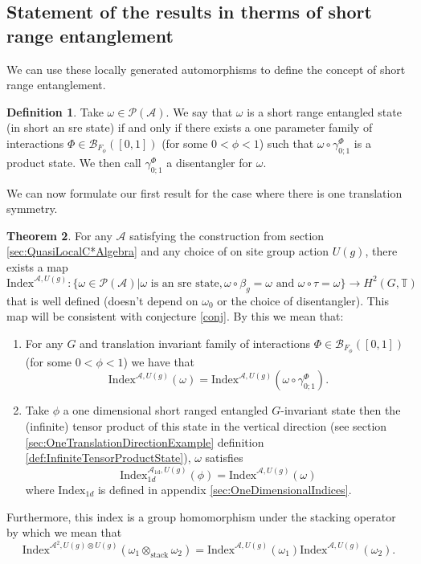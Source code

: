 \documentclass[12pt,a4paper,twoside]{article}
\newcommand{\BB}{\mathcal B}
\newcommand{\PP}{\mathcal P}
\newcommand{\TT}{\mathbb T}
\renewcommand{\AA}{\mathcal A}
\theoremstyle{definition}
\newtheorem{theorem}{Theorem}[section]
\newtheorem{definition}[theorem]{Definition}
\numberwithin{equation}{section}
\begin{document}
\subsection{Statement of the results in therms of short range entanglement}\label{sec:Results_1}
We can use these locally generated automorphisms to define the concept of short range entanglement.
\begin{definition}
	Take $\omega\in\PP(\AA)$. We say that $\omega$ is a short range entangled state (in short an sre state) if and only if there exists a one parameter family of interactions $\Phi\in\BB_{F_\phi}([0,1])$ (for some $0<\phi<1$) such that $\omega\circ\gamma^{\Phi}_{0;1}$ is a product state. We then call $\gamma^{\Phi}_{0;1}$ a disentangler for $\omega$.
\end{definition}
We can now formulate our first result for the case where there is one translation symmetry.
\begin{theorem}
	For any $\AA$ satisfying the construction from section \ref{sec:QuasiLocalC*Algebra} and any choice of on site group action $U(g)$, there exists a map
	\begin{equation}
		\textrm{Index}^{\AA,U(g)}:\{\omega\in\PP(\AA)|\omega\text{ is an sre state},\omega\circ\beta_g=\omega\text{ and }\omega\circ\tau=\omega\}\rightarrow H^2(G,\TT)
	\end{equation}
	that is well defined (doesn't depend on $\omega_0$ or the choice of disentangler). This map will be consistent with conjecture \ref{conj}. By this we mean that:
	\begin{enumerate}
		\item For any $G$ and translation invariant family of interactions $\Phi\in\BB_{F_{\phi}}([0,1])$ (for some $0<\phi<1$) we have that
		\begin{equation}
			\textrm{Index}^{\AA,U(g)}(\omega)=\textrm{Index}^{\AA,U(g)}(\omega\circ\gamma^{\Phi}_{0;1}).
		\end{equation}
		\item Take $\phi$ a one dimensional short ranged entangled $G$-invariant state then the (infinite) tensor product of this state in the vertical direction (see section \ref{sec:OneTranslationDirectionExample} definition \ref{def:InfiniteTensorProductState}), $\omega$ satisfies
		\begin{equation}
			\textrm{Index}^{\AA_{\text{1d}},U(g)}_{1d}(\phi)=\textrm{Index}^{\AA,U(g)}(\omega)
		\end{equation}
		where $\textrm{Index}_{1d}$ is defined in appendix \ref{sec:OneDimensionalIndices}.
	\end{enumerate}
	Furthermore, this index is a group homomorphism under the stacking operator by which we mean that
	\begin{equation}
		\textrm{Index}^{\AA^2,U(g)\otimes U(g)}(\omega_1\otimes_{\text{stack}}\omega_2)=\textrm{Index}^{\AA,U(g)}(\omega_1)\textrm{Index}^{\AA,U(g)}(\omega_2).
	\end{equation}
\end{theorem}
\end{document}
